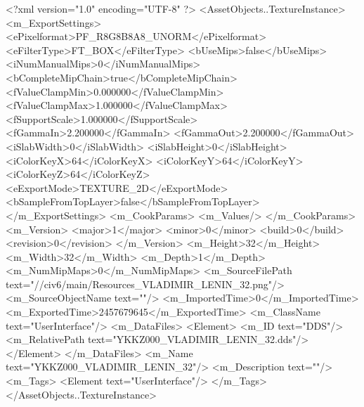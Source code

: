 <?xml version="1.0" encoding="UTF-8" ?>
<AssetObjects..TextureInstance>
	<m_ExportSettings>
		<ePixelformat>PF_R8G8B8A8_UNORM</ePixelformat>
		<eFilterType>FT_BOX</eFilterType>
		<bUseMips>false</bUseMips>
		<iNumManualMips>0</iNumManualMips>
		<bCompleteMipChain>true</bCompleteMipChain>
		<fValueClampMin>0.000000</fValueClampMin>
		<fValueClampMax>1.000000</fValueClampMax>
		<fSupportScale>1.000000</fSupportScale>
		<fGammaIn>2.200000</fGammaIn>
		<fGammaOut>2.200000</fGammaOut>
		<iSlabWidth>0</iSlabWidth>
		<iSlabHeight>0</iSlabHeight>
		<iColorKeyX>64</iColorKeyX>
		<iColorKeyY>64</iColorKeyY>
		<iColorKeyZ>64</iColorKeyZ>
		<eExportMode>TEXTURE_2D</eExportMode>
		<bSampleFromTopLayer>false</bSampleFromTopLayer>
	</m_ExportSettings>
	<m_CookParams>
		<m_Values/>
	</m_CookParams>
	<m_Version>
		<major>1</major>
		<minor>0</minor>
		<build>0</build>
		<revision>0</revision>
	</m_Version>
	<m_Height>32</m_Height>
	<m_Width>32</m_Width>
	<m_Depth>1</m_Depth>
	<m_NumMipMaps>0</m_NumMipMaps>
	<m_SourceFilePath text="//civ6/main/Resources_VLADIMIR_LENIN_32.png"/>
	<m_SourceObjectName text=""/>
	<m_ImportedTime>0</m_ImportedTime>
	<m_ExportedTime>2457679645</m_ExportedTime>
	<m_ClassName text="UserInterface"/>
	<m_DataFiles>
		<Element>
			<m_ID text="DDS"/>
			<m_RelativePath text="YKKZ000_VLADIMIR_LENIN_32.dds"/>
		</Element>
	</m_DataFiles>
	<m_Name text="YKKZ000_VLADIMIR_LENIN_32"/>
	<m_Description text=""/>
	<m_Tags>
		<Element text="UserInterface"/>
	</m_Tags>
</AssetObjects..TextureInstance>

